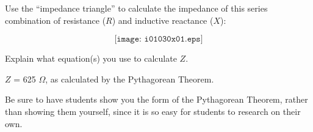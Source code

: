 

Use the ``impedance triangle'' to calculate the impedance of this series combination of resistance ($R$) and inductive reactance ($X$):

$$\texttt{[image: i01030x01.eps]}$$

Explain what equation(s) you use to calculate $Z$.







$Z$ = 625 $\Omega$, as calculated by the Pythagorean Theorem.







Be sure to have students show you the form of the Pythagorean Theorem, rather than showing them yourself, since it is so easy for students to research on their own.




